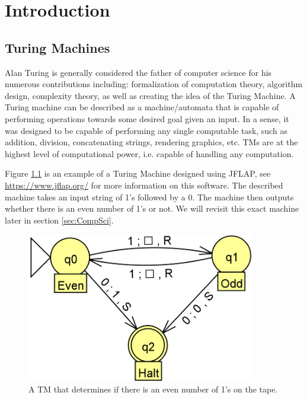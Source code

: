 \chapter{Introduction}\label{chapter:Intro}

\section{Turing Machines}\label{sec:TM}

Alan Turing is generally considered the father of computer science for his numerous contributions including: formalization of computation theory, algorithm design, complexity theory, as well as creating the idea of the Turing Machine.
A Turing machine can be described as a machine/automata that is capable of performing operations towards some desired goal given an input.
In a sense, it was designed to be capable of performing any single computable task, such as addition, division, concatenating strings, rendering graphics, etc.
TMs are at the highest level of computational power, i.e. capable of handling any computation.

Figure \ref{Fig:TM} is an example of a Turing Machine designed using JFLAP, see \href{https://www.jflap.org/}{https://www.jflap.org/} for more information on this software.
The described machine takes an input string of 1's followed by a 0.
The machine then outputs whether there is an even number of 1's or not.
We will revisit this exact machine later in section \ref{sec:CompSci}.

\begin{figure}[htb]
    \centering
    \includegraphics[width=10cm]{Images/SampleTMCrop.png}
       \caption{A TM that determines if there is an even number of 1's on the tape.}
           \label{Fig:TM}
\end{figure}

